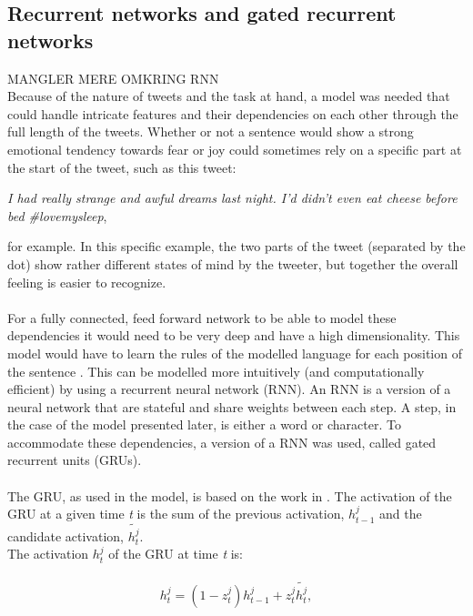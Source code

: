 \subsection{Recurrent networks and gated recurrent networks}
MANGLER MERE OMKRING RNN\\
Because of the nature of tweets and the task at hand, a model was needed that could handle intricate features and their dependencies on each other through the full length of the tweets. Whether or not a sentence would show a strong emotional tendency towards fear or joy could sometimes rely on a specific part at the start of the tweet, such as this tweet:\\
\begin{center}
\textit{I had really strange and awful dreams last night. I'd didn't even eat cheese before bed  \#lovemysleep},\\
\end{center}
for example. In this specific example, the two parts of the tweet (separated by the dot) show rather different states of mind by the tweeter, but together the overall feeling is easier to recognize.\\
\\
For a fully connected, feed forward network to be able to model these dependencies it would need to be very deep and have a high dimensionality. This model would have to learn the rules of the modelled language for each position of the sentence \cite{deeplearning}. This can be modelled more intuitively (and computationally efficient) by using a recurrent neural network (RNN). An RNN is a version of a neural network that are stateful and share weights between each step. A step, in the case of the model presented later, is either a word or character. To accommodate these dependencies, a version of a RNN was used, called gated recurrent units (GRUs).\\
\\
The GRU, as used in the model, is based on the work in \cite{chung}. The activation of the GRU at a given time \textit{t} is the sum of the previous activation, $h_{t-1}^{j}$ and the candidate activation, $\tilde{h_{t}^{j}}$.\\
The activation $h_{t}^{j}$ of the GRU at time \textit{t} is:\\
\\
\begin{equation} \label{eq:activation}
h_{t}^{j} = \left(1 - z_{t}^{j}\right)h_{t-1}^{j}+z_{t}^{j}\tilde{h_{t}^{j}},
\end{equation}\\

